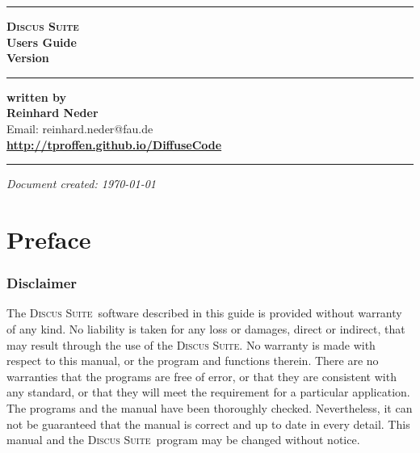 \documentclass[11pt]{report}
\newcommand{\Suite}{\textsc{Discus Suite\ }}
\newcommand{\suite}{\textsc{Discus Suite}}
\begin{document}

\begin{titlepage}
\begin{flushright}

  \hrule
  \vspace{15mm}
  \textbf{{ \suite}} \\
  \vspace{15mm}
  \textbf{{ Users Guide}} \\
  \vspace{10mm}
  \textbf{{\Huge Version  \version}} \\
  \vspace{10mm}

  \hrule
  \vspace{45mm}
  \textbf{written by} \\

  \vspace{5mm}
  \textbf{\Large Reinhard Neder} \\
  Email: reinhard.neder@fau.de \\

  \vspace{20mm}
  \textbf{\Large \url{http://tproffen.github.io/DiffuseCode}} \\

  \vspace{3mm}
  \hrule

\end{flushright}
\begin{flushright}
  \textit{Document created: \today}
\end{flushright}

\end{titlepage}


\chapter*{Preface}
\subsection*{Disclaimer}

The \Suite software described in this guide is
provided without warranty of any kind.  No liability is taken for any loss
or damages, direct or indirect, that may result through the use of the
\suite.  No warranty is made with respect to this manual, or the program
and functions therein.  There are no warranties that the programs are free
of error, or that they are consistent with any standard, or that they will
meet the requirement for a particular application.  The programs and the
manual have been thoroughly checked.  Nevertheless, it can not be
guaranteed that the manual is correct and up to date in every detail. This
manual and the \Suite program may be changed without notice.\par
\end{document}
